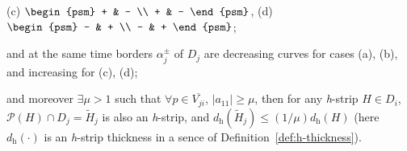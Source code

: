 \begin{theorem}
\begin{enumerate}
\begin{center}
				(c) $\begin{psm} + & - \\ + & - \end{psm}$, \quad
				(d) $\begin{psm} - & + \\ - & + \end{psm}$;		
			\end{center}
			and at the same time borders $\alpha_j^{\pm}$ of $D_j$ are decreasing curves for cases (a), (b), and increasing for (c), (d);
	\end{enumerate}
	and moreover $\exists \mu > 1$ such that $\forall p \in \overline{V_{ji}}$, $|a_{11}| \ge \mu$, then for any \emph{h}-strip $H \in D_i$, $\mathcal{P} (H) \cap D_j = \widetilde{H}_j$ is also an \emph{h}-strip, and $d_{\mathrm{h}}(\widetilde{H}_j) \le (1 / \mu) d_{\mathrm{h}}(H)$ (here $d_{\mathrm{h}}(\cdot)$ is an \emph{h}-strip thickness in a sence of Definition~\ref{def:h-thickness}).
\end{theorem}
